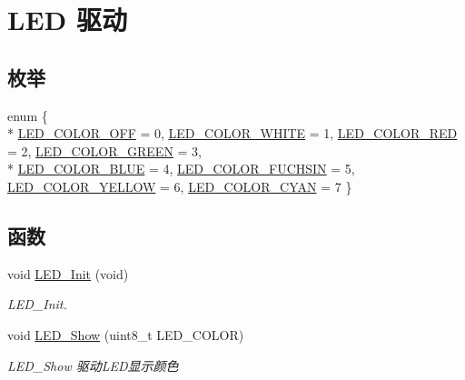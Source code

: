 \hypertarget{group__led__driver}{}\section{L\+ED 驱动}
\label{group__led__driver}
\subsection*{枚举}
\begin{DoxyCompactItemize}
\item 
enum \{ \\*
\hyperlink{group__led__driver_gga06fc87d81c62e9abb8790b6e5713c55bafea1b6d1e36efeb9177297ad5b634bdd}{L\+E\+D\+\_\+\+C\+O\+L\+O\+R\+\_\+\+O\+FF} = 0, 
\hyperlink{group__led__driver_gga06fc87d81c62e9abb8790b6e5713c55bae0568a71373a19d68ac019a67fcb2c3b}{L\+E\+D\+\_\+\+C\+O\+L\+O\+R\+\_\+\+W\+H\+I\+TE} = 1, 
\hyperlink{group__led__driver_gga06fc87d81c62e9abb8790b6e5713c55ba20c3f7e3db2eca4ce0fe784975373384}{L\+E\+D\+\_\+\+C\+O\+L\+O\+R\+\_\+\+R\+ED} = 2, 
\hyperlink{group__led__driver_gga06fc87d81c62e9abb8790b6e5713c55ba64cda76c497793915fcf24c216d0f37c}{L\+E\+D\+\_\+\+C\+O\+L\+O\+R\+\_\+\+G\+R\+E\+EN} = 3, 
\\*
\hyperlink{group__led__driver_gga06fc87d81c62e9abb8790b6e5713c55ba457a1e8f0680efd8cf6d76d1a6465b2b}{L\+E\+D\+\_\+\+C\+O\+L\+O\+R\+\_\+\+B\+L\+UE} = 4, 
\hyperlink{group__led__driver_gga06fc87d81c62e9abb8790b6e5713c55ba323d8bd5ea675c6701c2945fb2e124bd}{L\+E\+D\+\_\+\+C\+O\+L\+O\+R\+\_\+\+F\+U\+C\+H\+S\+IN} = 5, 
\hyperlink{group__led__driver_gga06fc87d81c62e9abb8790b6e5713c55bab792f0e1b8644f6f22f3f0ab799bd3a9}{L\+E\+D\+\_\+\+C\+O\+L\+O\+R\+\_\+\+Y\+E\+L\+L\+OW} = 6, 
\hyperlink{group__led__driver_gga06fc87d81c62e9abb8790b6e5713c55ba20221062a48820a1e6caabc3fe8c0723}{L\+E\+D\+\_\+\+C\+O\+L\+O\+R\+\_\+\+C\+Y\+AN} = 7
 \}
\end{DoxyCompactItemize}
\subsection*{函数}
\begin{DoxyCompactItemize}
\item 
void \hyperlink{group__led__driver_gab3570a8c9e1266519ad1c7e00093812b}{L\+E\+D\+\_\+\+Init} (void)\hypertarget{group__led__driver_gab3570a8c9e1266519ad1c7e00093812b}{}\label{group__led__driver_gab3570a8c9e1266519ad1c7e00093812b}

\begin{DoxyCompactList}\small\item\em L\+E\+D\+\_\+\+Init. \end{DoxyCompactList}\item 
void \hyperlink{group__led__driver_gaf96fb94f6dcac6be219eb0019fe3b4ae}{L\+E\+D\+\_\+\+Show} (uint8\+\_\+t L\+E\+D\+\_\+\+C\+O\+L\+OR)
\begin{DoxyCompactList}\small\item\em L\+E\+D\+\_\+\+Show 驱动\+L\+E\+D显示颜色 \end{DoxyCompactList}\end{DoxyCompactItemize}


